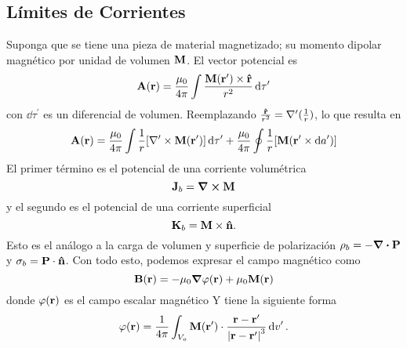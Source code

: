 \subsection{Límites de Corrientes}
Suponga que se tiene una pieza de material magnetizado; su momento dipolar magnético por unidad de volumen $\vb{M}$. El vector potencial es
\begin{equation}
	\vb{A} (\vb{r}) = \frac{\mu_0}{4\pi} \int \frac{\vb{M} (\vb{r} ^\prime) \times \vu{r}}{r^2} \dd{\tau ^\prime}
\end{equation}
con $\dd{\tau ^\prime}$ es un diferencial de volumen. Reemplazando $\frac{\vu{r}}{r^2} = \nabla ^\prime (\frac{1}{r})$, lo que resulta en
\begin{equation}
	\vb{A} (\vb{r}) = \frac{\mu_0}{4\pi} \int \frac{1}{r} \qty[\nabla ^\prime \times \vb{M} (\vb{r}^\prime)] \dd{\tau ^\prime} + \frac{\mu_0}{4\pi} \oint \frac{1}{r} \qty[\vb{M} (\vb{r}^\prime \times \dd{a^\prime})]
\end{equation}
El primer término es el potencial de una corriente volumétrica
\begin{equation}
	\vb{J} _b = \curl{\vb{M}}
\end{equation}
y el segundo es el potencial de una corriente superficial
\begin{equation}
	\vb{K} _b = \vb{M} \times \vu{n}.
\end{equation}
Esto es el análogo a la carga de volumen y superficie de polarización $\rho _b = -\div{\vb{P}}$ y $\sigma _b = \vb{P} \cdot \vu{n}$. Con todo esto, podemos expresar el campo magnético como
\begin{equation}
	\vb{B} (\vb{r}) = -\mu_0 \grad{\varphi (\vb{r})} + \mu_0 \vb{M} (\vb{r})
\end{equation}
donde $\varphi (\vb{r})$ es el campo escalar magnético  Y tiene la siguiente forma
\begin{equation}
	\varphi (\vb{r}) = \frac{1}{4\pi} \int _{V_o} \vb{M} (\vb{r} ^\prime) \cdot \frac{\vb{r} - \vb{r} ^\prime}{\abs{\vb{r} - \vb{r} ^\prime}^3} \dd{v} ^\prime.
\end{equation}

